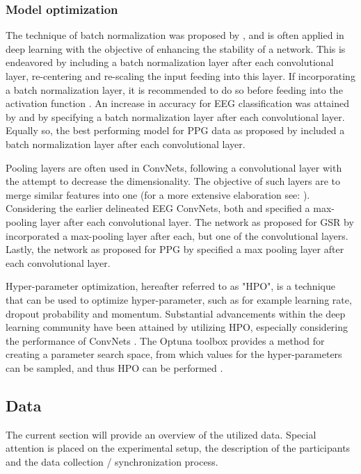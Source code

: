 \documentclass[12pt]{article}
\begin{document}
\subsubsection{Model optimization}
The technique of batch normalization was proposed by  ,  and is often applied in deep learning with the objective of enhancing the stability of a network. This is endeavored by including a batch normalization layer after each convolutional layer, re-centering and re-scaling the input feeding into this layer. If incorporating a batch normalization layer, it is recommended to do so before feeding into the activation function \cite{ioffe2015batch}. An increase in accuracy for EEG classification was attained by  and  by specifying a batch normalization layer after each convolutional layer. Equally so, the best performing model for PPG data as proposed by  included a batch normalization layer after each convolutional layer.  

Pooling layers are often used in ConvNets, following a convolutional layer with the attempt to decrease the dimensionality. The objective of such layers are to merge similar features into one (for a more extensive elaboration see: ). Considering the earlier delineated EEG ConvNets, both  and  specified a max-pooling layer after each convolutional layer. The network as proposed for GSR by  incorporated a max-pooling layer after each, but one of the convolutional layers. Lastly, the network as proposed for PPG by \cite{biswas2019cornet}  specified a max pooling layer after each convolutional layer. 

Hyper-parameter optimization, hereafter referred to as "HPO", is a technique that can be used to optimize hyper-parameter, such as for example learning rate, dropout probability and momentum. Substantial advancements within the deep learning community have been attained by utilizing HPO, especially considering the performance of ConvNets \cite{bergstra2012random}. The Optuna toolbox provides a method for creating a parameter search space, from which values for the hyper-parameters can be sampled, and thus HPO can be performed \cite{akiba2019optuna}. 

\subsection{Data}
The current section will provide an overview of the utilized data. Special attention is placed on the experimental setup, the description of the participants and the data collection / synchronization process. 
\end{document}
